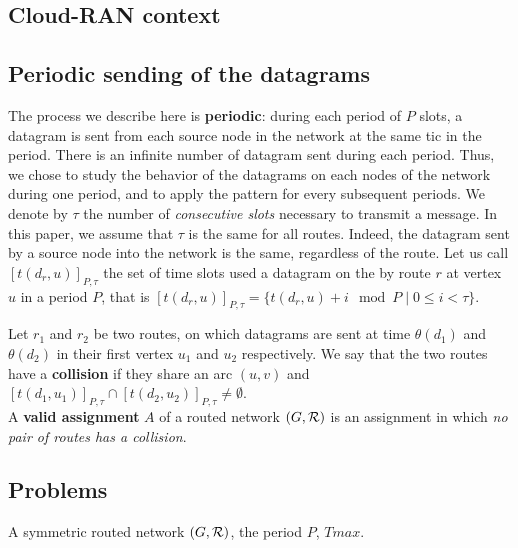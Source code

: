 \documentclass[english]{article}
\begin{document}
  \subsection{Cloud-RAN context}
     

     
  \subsection{Periodic sending of the datagrams}
 The process we describe here is \textbf{periodic}: during each period of $P$ slots, a datagram is sent from each source node in the network at the same tic in the period. There is an infinite number of datagram sent during each period. Thus, we chose to study the behavior of the datagrams on each nodes of the network during one period, and to apply the pattern for every subsequent periods.
             We denote by $\tau$ the number 
      of \emph{consecutive slots} necessary to transmit a message. In this paper, we assume that $\tau$ is the same for all routes. Indeed, the datagram sent by a source node into the network is the same, regardless of the route. Let us call $[t(d_r,u)]_{P,\tau}$ the set of time slots used a datagram on the by route $r$ at vertex $u$ in a period $P$, that is $[t(d_r,u)]_{P,\tau} = \{t(d_r,u) + i \mod P \mid 0 \leq i < \tau \}$. 

      Let $r_1$ and $r_2$ be two routes, on which datagrams are sent at time $\theta(d_1)$ and $\theta(d_2)$ in their first vertex $u_1$ and $u_2$ respectively.
      We say that the two routes have a {\bf collision} if they share an arc $(u,v)$ and $[t(d_1,u_1)]_{P,\tau} \cap [t(d_2,u_2)]_{P,\tau} \neq \emptyset$.\\

        A {\bf valid assignment} $A$ of a routed network $(G,{\cal R})$ is an assignment in which \emph{no pair of routes has a collision}.
        
\subsection{Problems}
       

        A symmetric routed network $(G,{\cal R})$, the period $P$, $Tmax$.
      
\end{document}
